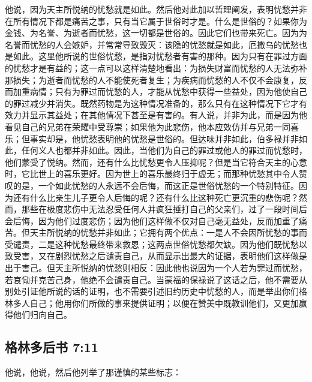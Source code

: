 他说，因为天主所悦纳的忧愁就是如此。然后他对此加以哲理阐发，表明忧愁并非在所有情况下都是痛苦之事，只有当它属于世俗时才是。什么是世俗的？如果你为金钱、为名誉、为逝者而忧愁，这一切都是世俗的。因此它们也带来死亡。因为为名誉而忧愁的人会嫉妒，并常常导致毁灭：该隐的忧愁就是如此，厄撒乌的忧愁也是如此。这里他所说的世俗忧愁，是指对忧愁者有害的那种。因为只有在罪过方面的忧愁才是有益的；这一点可以这样清楚地看出：为损失财富而忧愁的人无法弥补那损失；为逝者而忧愁的人不能使死者复生；为疾病而忧愁的人不仅不会康复，反而加重病情；只有为罪过而忧愁的人，才能从忧愁中获得一些益处，因为他使自己的罪过减少并消失。既然药物是为这种情况准备的，那么只有在这种情况下它才有效力并显示其益处；在其他情况下甚至是有害的。有人说，并非为此，而是因为他看见自己的兄弟在荣耀中受尊崇；如果他为此悲伤，他本应效仿并与兄弟一同喜乐；但事实却是，他忧愁表明他的忧愁是世俗的。但达味并非如此，伯多禄并非如此，任何义人也都并非如此。因此，当他们为自己的罪过或他人的罪过而忧愁时，他们蒙受了悦纳。然而，还有什么比忧愁更令人压抑呢？但是当它符合天主的心意时，它比世上的喜乐更好。因为世上的喜乐最终归于虚无；而那种忧愁其中令人赞叹的是，一个如此忧愁的人永远不会后悔，而这正是世俗忧愁的一个特别特征。因为还有什么比亲生儿子更令人后悔的呢？还有什么比这种死亡更沉重的悲伤呢？然而，那些在极度悲伤中无法忍受任何人并疯狂捶打自己的父亲们，过了一段时间后会后悔，因为他们过度悲伤；因为他们这样做不仅对自己毫无益处，反而加重了痛苦。但天主所悦纳的忧愁并非如此；它拥有两个优点：一是人不会因所忧愁的事而受谴责，二是这种忧愁最终带来救恩；这两点世俗忧愁都欠缺。因为他们既忧愁以致受害，又在剧烈忧愁之后谴责自己，从而显示出最大的证据，表明他们这样做是出于害己。但天主所悦纳的忧愁则相反：因此他也说因为一个人若为罪过而忧愁，若哀恸并克苦己身，他绝不会谴责自己。当蒙福的保禄说了这话之后，他不需要从别处引证他所说的话的证明，也不需要引述旧约历史中忧愁的人，而是举出你们格林多人自己；他用你们所做的事来提供证明；以便在赞美中既教训他们，又更加赢得他们归向自己。\par


\subsection{格林多后书 7:11}

他说，他说，然后他列举了那谨慎的某些标志：\par

